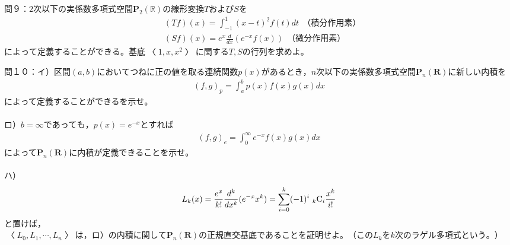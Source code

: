 \documentclass[dvipdfmx,uplatex,11pt]{jsarticle}
\begin{document}
%
%
%
\newpage
%
%
%
\noindent
問９：$2次以下の実係数多項式空間\bm{P}_2(\mathbb{R})の線形変換TおよびSを$
\begin{eqnarray*}
& (Tf)(x)=\int^{1}_{-1}(x-t)^2f(t)dt~~（積分作用素） \\
& (Sf)(x)=e^x\frac{d}{dx}(e^{-x}f(x))~~（微分作用素）
\end{eqnarray*}
$によって定義することができる。基底〈1,x,x^2〉に関するT,Sの行列を求めよ。$





























%
%
%
\newpage
%
%
%
\noindent
問１０：$イ）区間(a,b)においてつねに正の値を取る連続関数p(x)があるとき，n次以下の実係数多項式空間\bm{P}_n(\bm{R})に新しい内積を$
\begin{eqnarray*}
(f,g)_p=\int^{b}_{a}p(x)f(x)g(x)dx
\end{eqnarray*}
によって定義することができるを示せ。\\
\\
ロ）$b=\infty であっても，p(x)=e^{-x}とすれば$
\begin{eqnarray*}
(f,g)_{e}=\int^{\infty}_{0}e^{-x}f(x)g(x)dx
\end{eqnarray*}
によって$\bm{P}_n(\bm{R})に内積が定義できることを示せ。$\\
\\
ハ）
\begin{eqnarray*}
L_k(x)=\frac{e^x}{k!}\frac{d^k}{dx^k}(e^{-x}x^k)=\sum^{k}_{i=0}(-1)^i ~_{k}{\rm C}_{i}\frac{x^k}{i!}
\end{eqnarray*}
と置けば，$〈L_0 ,L_1 ,\cdots ,L_n〉は，ロ）の内積に関して\bm{P}_n(\bm{R})の正規直交基底であることを証明せよ。（このL_k をk次の\textbf{ラゲル多項式}という。）$
\end{document}
